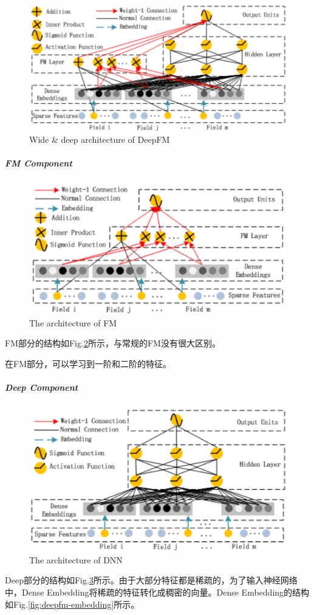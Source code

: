 \begin{figure}[h]
	\centering
	\includegraphics[width=.8\textwidth]{pics/deepfm.png}
	\caption{Wide \& deep architecture of DeepFM}
	\label{fig:deepfm}
\end{figure}

\subparagraph{FM Component}
\begin{figure}[h]
	\centering
	\includegraphics[width=.8\textwidth]{pics/deepfm-fm.png}
	\caption{ The architecture of FM}
	\label{fig:deepfm-fm}
\end{figure}
FM部分的结构如Fig.\ref{fig:deepfm-fm}所示，与常规的FM没有很大区别。

在FM部分，可以学习到一阶和二阶的特征。

\subparagraph{Deep Component}
\begin{figure}[h]
	\centering
	\includegraphics[width=.8\textwidth]{pics/deepfm-deep.png}
	\caption{The architecture of DNN}
	\label{fig:deepfm-deep}
\end{figure}
Deep部分的结构如Fig.\ref{fig:deepfm-deep}所示。由于大部分特征都是稀疏的，为了输入神经网络中，Dense Embedding将稀疏的特征转化成稠密的向量。Dense Embedding的结构如Fig.\ref{fig:deepfm-embedding}所示。

